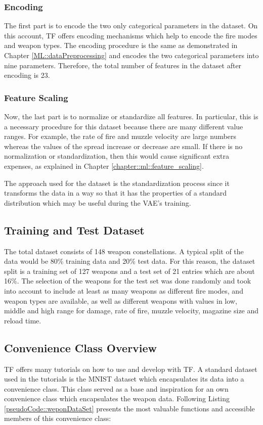 \documentclass[MGS,Master,english]{twbook}%
\begin{document}
\subsubsection{Encoding}
The first part is to encode the two only categorical parameters in the dataset. On this account, \ac{TF} offers encoding mechanisms which help to encode the fire modes and weapon types. The encoding procedure is the same as demonstrated in Chapter \ref{ML::dataPreprocessing} and encodes the two categorical parameters into nine parameters. Therefore, the total number of features in the dataset after encoding is 23.

\subsubsection{Feature Scaling}
Now, the last part is to normalize or standardize all features. In particular, this is a necessary procedure for this dataset because there are many different value ranges. For example, the rate of fire and muzzle velocity are large numbers whereas the values of the spread increase or decrease are small. If there is no normalization or standardization, then this would cause significant extra expenses, as explained in Chapter \ref{chapter::ml::feature_scaling}.

The approach used for the dataset is the standardization process since it transforms the data in a way so that it has the properties of a standard distribution which may be useful during the \ac{VAE}'s training. 

\subsection{Training and Test Dataset}
The total dataset consists of 148 weapon constellations. A typical split of the data would be 80\% training data and 20\% test data. For this reason, the dataset split is a training set of 127 weapons and a test set of 21 entries which are about 16\%. The selection of the weapons for the test set was done randomly and took into account to include at least as many weapons as different fire modes, and weapon types are available, as well as different weapons with values in low, middle and high range for damage, rate of fire, muzzle velocity, magazine size and reload time.

\subsection{Convenience Class Overview}
\ac{TF} offers many tutorials on how to use and develop with \ac{TF}. A standard dataset used in the tutorials is the MNIST dataset which encapsulates its data into a convenience class. This class served as a base and inspiration for an own convenience class which encapsulates the weapon data. Following Listing \ref{pseudoCode::weponDataSet} presents the most valuable functions and accessible members of this convenience class:
\end{document}
